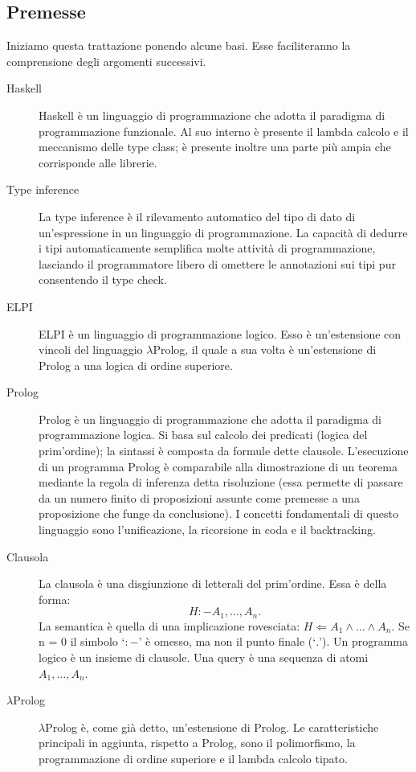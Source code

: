 \documentclass[12pt,a4paper,openright,twoside]{report}
\begin{document}
\subsection{Premesse}
Iniziamo questa trattazione ponendo alcune basi. Esse faciliteranno la comprensione degli argomenti successivi.
\begin{description}
 \item[Haskell] Haskell è un linguaggio di programmazione che adotta il paradigma di programmazione funzionale. Al suo interno è presente il lambda calcolo e il meccanismo delle type class; è presente inoltre una parte più ampia che corrisponde alle librerie.
 \item[Type inference] La type inference è il rilevamento automatico del tipo di dato di un'espressione in un linguaggio di programmazione. La capacità di dedurre i tipi automaticamente semplifica molte attività di programmazione, lasciando il programmatore libero di omettere le annotazioni sui tipi pur consentendo il type check.
 \item[ELPI] ELPI è un linguaggio di programmazione logico. Esso è un'estensione con vincoli del linguaggio $\lambda$Prolog, il quale a sua volta è un'estensione di Prolog a una logica di ordine superiore.
 \item[Prolog] Prolog è un linguaggio di programmazione che adotta il paradigma di programmazione logica. Si basa sul calcolo dei predicati (logica del prim'ordine); la sintassi è composta da formule dette clausole. L'esecuzione di un programma Prolog è comparabile alla dimostrazione di un teorema mediante la regola di inferenza detta risoluzione (essa permette di passare da un numero finito di proposizioni assunte come premesse a una proposizione che funge da conclusione). I concetti fondamentali di questo linguaggio sono l'unificazione, la ricorsione in coda e il backtracking.
 \item[Clausola] La clausola è una disgiunzione di letterali del prim'ordine. Essa è della forma:
 \begin{equation}
  H :- A_1,\ldots,A_n.
 \end{equation}
 La semantica è quella di una implicazione rovesciata: $H \Leftarrow A_1 \wedge \ldots \wedge A_n$. Se n = 0 il simbolo `$:-$' è omesso, ma non il punto finale (`$.$'). Un programma logico è un insieme di clausole. Una query è una sequenza di atomi $A_1,\ldots,A_n$.
 \item[$\lambda$Prolog] $\lambda$Prolog è, come già detto, un'estensione di Prolog. Le caratteristiche principali in aggiunta, rispetto a Prolog, sono il polimorfismo, la programmazione di ordine superiore e il lambda calcolo tipato.
\end{description}
\end{document}
